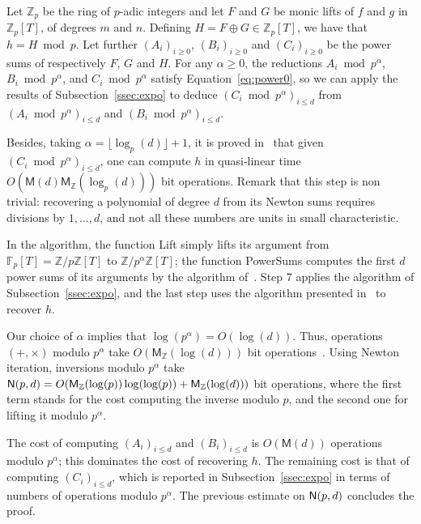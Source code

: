 \documentclass[amsthm]{elsart}
\def\Z {\ensuremath{\mathbb{Z}}}
\def\F {\ensuremath{\mathbb{F}}}
\def\M {\ensuremath{\mathsf{M}}}
\theoremstyle{plain}
\begin{document}
\begin{pf}
  Let $\Z_p$ be the ring of $p$-adic integers and let $F$ and $G$ be
  monic lifts of $f$ and $g$ in $\Z_p[T]$, of degrees $m$ and
  $n$. Defining $H=F \oplus G \in \Z_p[T]$, we have that $h=H \bmod
  p$. Let further $(A_i)_{i \ge 0}$, $(B_i)_{i \ge 0}$ and $(C_i)_{i
    \ge 0}$ be the power sums of respectively $F$, $G$ and $H$. For
  any $\alpha \ge 0$, the reductions $A_i \bmod p^\alpha$, $B_i \bmod
  p^\alpha$, and $C_i \bmod p^\alpha$ satisfy
  Equation~\eqref{eq:power0}, so we can apply the results of
  Subsection~\ref{ssec:expo} to deduce $(C_i \bmod p^\alpha)_{i \le
    d}$ from $(A_i \bmod p^\alpha)_{i\le d}$ and $(B_i \bmod
  p^\alpha)_{i \le d}$.

  Besides, taking $\alpha= \lfloor\log_p (d) \rfloor+1$, it is proved
  in~\cite{BoGoPeSc05} that given $(C_i \bmod p^\alpha)_{i \le d}$,
  one can compute $h$ in quasi-linear time $O(\M(d) \M_\Z(\log_p(d)))$
  bit operations. Remark that this step is non trivial: recovering a
  polynomial of degree $d$ from its Newton sums requires divisions by
  $1,\dots,d$, and not all these numbers are units in small
  characteristic.

  In the algorithm, the function {\sf Lift} simply lifts its argument
  from $\F_p[T]=\Z/p\Z[T]$ to $\Z/p^\alpha\Z[T]$; the function {\sf
    PowerSums} computes the first $d$ power sums of its arguments by
  the algorithm of~\cite{Schonhage82}. Step 7 applies the algorithm of
  Subsection~\ref{ssec:expo}, and the last step uses the algorithm
  presented in~\cite{BoGoPeSc05} to recover $h$.

  Our choice of $\alpha$ implies that $\log(p^\alpha)=O(\log(d))$.
  Thus, operations $(+,\times)$ modulo $p^\alpha$ take
  $O(\M_\Z(\log(d)))$ bit operations~\cite[Chapter~9]{GaGe99}.  Using
  Newton iteration, inversions modulo $p^\alpha$ take ${\sf
    N}(p,d)=O(\M_\Z(\log(p))\log(\log(p)) + \M_\Z(\log(d)))$ bit
  operations, where the first term stands for the cost computing the
  inverse modulo $p$, and the second one for lifting it modulo
  $p^\alpha$.

  The cost of computing $(A_i)_{i \le d}$ and $(B_i)_{i \le d}$ is
  $O(\M(d))$ operations modulo $p^\alpha$; this dominates the cost of
  recovering $h$. The remaining cost is that of computing $(C_i)_{i
    \le d}$, which is reported in Subsection~\ref{ssec:expo} in terms
  of numbers of operations modulo $p^\alpha$. The previous estimate on
  ${\sf N}(p,d)$ concludes the proof.
\end{pf}
\end{document}
